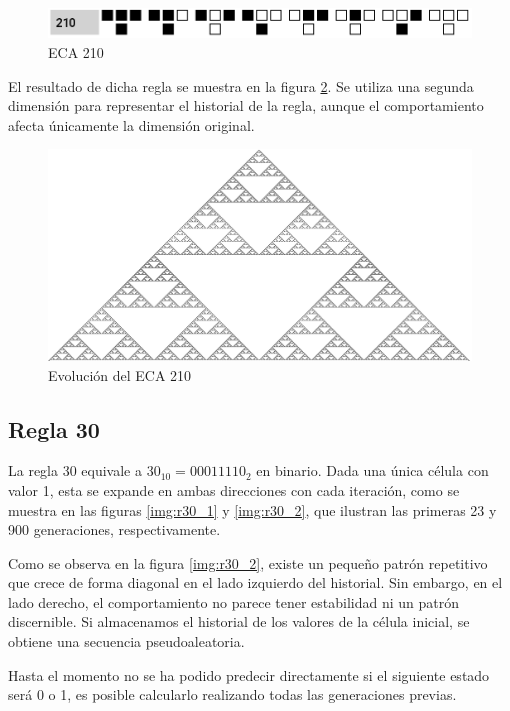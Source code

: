 \documentclass[12pt,twoside]{article}
\begin{document}
	\begin{figure}[H]
		\centering
		\includegraphics[width=\textwidth]{img/eca1.png}
		\caption{ECA 210}
		\label{img:eca1}
	\end{figure}
	
	El resultado de dicha regla se muestra en la figura \ref{img:eca2}. Se utiliza una segunda dimensión para representar el historial de la regla, aunque el comportamiento afecta únicamente la dimensión original.
	
	\begin{figure}[H]
		\centering
		\includegraphics[width=\textwidth]{img/eca2.png}
		\caption{Evolución del ECA 210}
		\label{img:eca2}
	\end{figure}
	
	\subsection{Regla 30}
	
	La regla 30 equivale a $30_{10}=00011110_2$ en binario. Dada una única célula con valor 1, esta se expande en ambas direcciones con cada iteración, como se muestra en las figuras \ref{img:r30_1} y \ref{img:r30_2}, que ilustran las primeras 23 y 900 generaciones, respectivamente.
	
	Como se observa en la figura \ref{img:r30_2}, existe un pequeño patrón repetitivo que crece de forma diagonal en el lado izquierdo del historial. Sin embargo, en el lado derecho, el comportamiento no parece tener estabilidad ni un patrón discernible. Si almacenamos el historial de los valores de la célula inicial, se obtiene una secuencia pseudoaleatoria.
	
	Hasta el momento no se ha podido predecir directamente si el siguiente estado será 0 o 1, es posible calcularlo realizando todas las generaciones previas.
	
\end{document}
